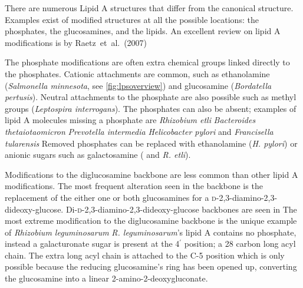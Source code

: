 There are numerous Lipid A structures that differ from the canonical structure. Examples exist of modified structures at all the possible locations: the phosphates, the glucosamines, and the lipids. An excellent review on lipid A modifications is by Raetz~et~al.~(2007)

 The phosphate modifications are often extra chemical groups linked directly to the phosphates. Cationic attachments are common, such as ethanolamine (\eg \textit{Salmonella minnesota}, see \cref{fig:lpsoverview}) and glucosamine (\eg \textit{Bordatella pertusis}). Neutral attachments to the phosphate are also possible such as methyl groups (\eg \textit{Leptospira interrogans}). The phosphates can also be absent; examples of lipid A molecules missing a phosphate are \textit{Rhizobium etli} \textit{Bacteroides thetaiotaomicron} \textit{Prevotella intermedia} \textit{Helicobacter pylori} and \textit{Francisella tularensis} Removed phosphates can  be replaced with ethanolamine (\eg \textit{H. pylori}) or anionic sugars such as galactosamine (\eg \caulobacter{} and \textit{R. etli}).
 
Modifications to the diglucosamine backbone are less common than other lipid A modifications. The most frequent alteration seen in the backbone is the replacement of the either one or both glucosamines for a  \textsc{d}-2,3-diamino-2,3-dideoxy-glucose. Di-\textsc{d}-2,3-diamino-2,3-dideoxy-glucose backbones are seen in \caulobacter{} 
The most extreme modification to the diglucosamine backbone is the unique example of \textit{Rhizobium leguminosarum} \textit{R. leguminosarum}'s lipid A contains no phosphate, instead a galacturonate sugar is present at the 4$^\prime$ position; a 28 carbon long acyl chain. The extra long acyl chain is attached to the C-5 position which is only possible because the reducing glucosamine's ring has been opened up, converting the glucosamine into a linear 2-amino-2-deoxygluconate. 

